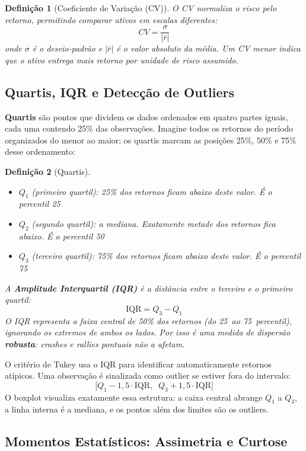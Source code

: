 \documentclass[11pt,a4paper]{article}
\theoremstyle{quant}
\newtheorem{definicao}{Definição}[section]
\begin{document}
\begin{definicao}[Coeficiente de Variação (CV)]
O CV normaliza o risco pelo retorno, permitindo comparar ativos em escalas diferentes:
\[
  CV = \frac{\sigma}{|\bar{r}|}
\]
onde $\sigma$ é o desvio-padrão e $|\bar{r}|$ é o valor absoluto da média.
Um CV menor indica que o ativo entrega mais retorno por unidade de risco assumido.
\end{definicao}

\subsection{Quartis, IQR e Detecção de Outliers}

\textbf{Quartis} são pontos que dividem os dados ordenados em quatro partes iguais,
cada uma contendo 25\% das observações. Imagine todos os retornos do período
organizados do menor ao maior; os quartis marcam as posições 25\%, 50\% e 75\%
desse ordenamento:

\begin{definicao}[Quartis]
\begin{itemize}
  \item $Q_1$ (primeiro quartil): 25\% dos retornos ficam abaixo deste valor.
        É o percentil 25
  \item $Q_2$ (segundo quartil): a mediana. Exatamente metade dos retornos fica abaixo.
        É o percentil 50
  \item $Q_3$ (terceiro quartil): 75\% dos retornos ficam abaixo deste valor.
        É o percentil 75
\end{itemize}
A \textbf{Amplitude Interquartil (IQR)} é a distância entre o terceiro e o primeiro quartil:
\[
  \text{IQR} = Q_3 - Q_1
\]
O IQR representa a faixa central de 50\% dos retornos (do 25\textordmasculine\ ao 75\textordmasculine\ percentil),
ignorando os extremos de ambos os lados. Por isso é uma medida de dispersão
\textbf{robusta}: crashes e rallies pontuais não a afetam.
\end{definicao}

O critério de Tukey usa o IQR para identificar automaticamente retornos atípicos.
Uma observação é sinalizada como outlier se estiver fora do intervalo:
\[
  \bigl[Q_1 - 1{,}5\cdot\text{IQR},\;\; Q_3 + 1{,}5\cdot\text{IQR}\bigr]
\]
O boxplot visualiza exatamente essa estrutura: a caixa central abrange $Q_1$ a $Q_3$,
a linha interna é a mediana, e os pontos além dos limites são os outliers.

\subsection{Momentos Estatísticos: Assimetria e Curtose}
\end{document}
